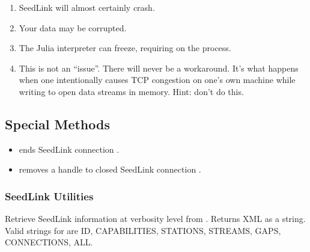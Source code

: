 \documentclass[letterpaper,11pt,english]{sphinxmanual}
\begin{document}
\begin{enumerate}
\begin{description}
\begin{enumerate}
\item {} 
SeedLink will almost certainly crash.

\item {} 
Your data may be corrupted.

\item {} 
The Julia interpreter can freeze, requiring  on the process.

\item {} 
This is not an “issue”. There will never be a workaround. It’s what happens when one intentionally causes TCP congestion on one’s own machine while writing to open data streams in memory. Hint: don’t do this.

\end{enumerate}

\end{description}

\end{enumerate}


\subsection{Special Methods}
\label{\detokenize{src/Web/seedlink:special-methods}}\begin{itemize}
\item {} 
 ends SeedLink connection .

\item {} 
 removes a handle to closed SeedLink connection .

\end{itemize}


\subsubsection{SeedLink Utilities}
\label{\detokenize{src/Web/seedlink:seedlink-utilities}}

\begin{fulllineitems}
\label{\detokenize{src/Web/seedlink:SL_info}}
\end{fulllineitems}


Retrieve SeedLink information at verbosity level  from . Returns XML as a string. Valid strings for  are ID, CAPABILITIES, STATIONS, STREAMS, GAPS, CONNECTIONS, ALL.
\end{document}
